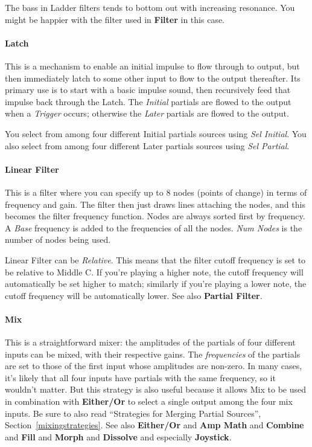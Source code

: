 \documentclass{article}
\begin{document}
The bass in Ladder filters tends to bottom out with increasing resonance.  You might be happier with the filter used in {\bf Filter} in this case.

\paragraph{Latch}  This is a mechanism to enable an initial impulse to flow through to output, but then immediately latch to some other input to flow to the output thereafter.  Its primary use is to start with a basic impulse sound, then recursively feed that impulse back through the Latch.  The {\it Initial} partials are flowed to the output when a {\it Trigger} occurs; otherwise the {\it Later} partials are flowed to the output.

You select from among four different Initial partials sources using {\it Sel Initial}.  You also select from among four different Later partials sources using {\it Sel Partial}.  

\paragraph{Linear Filter} This is a filter where you can specify up to 8 nodes (points of change) in terms of frequency and gain.  The filter then just draws lines attaching the nodes, and this becomes the filter frequency function.  Nodes are always sorted first by frequency.  A {\it Base} frequency is added to the frequencies of all the nodes.  {\it Num Nodes} is the number of nodes being used.

Linear Filter can be {\it Relative}.  This means that the filter cutoff frequency is set to be relative to Middle C.  If you're playing a higher note, the cutoff frequency will automatically be set higher to match; similarly if you're playing a lower note, the cutoff frequency will be automatically lower.  See also {\bf Partial Filter}.

\paragraph{Mix} This is a straightforward mixer: the amplitudes of the partials of four different inputs can be mixed, with their respective gains.  The {\it frequencies} of the partials are set to those of the first input whose amplitudes are non-zero.  In many cases, it's likely that all four inputs have partials with the same frequency, so it wouldn't matter.  But this strategy is also useful because it allows Mix to be used in combination with {\bf Either/Or} to select a single output among the four mix inputs.  Be sure to also read ``Strategies for Merging Partial Sources'', Section~\ref{mixingstrategies}.  See also {\bf Either/Or} and {\bf Amp Math} and {\bf Combine} and {\bf Fill} and {\bf Morph} and {\bf Dissolve} and especially {\bf Joystick}.
\end{document}
